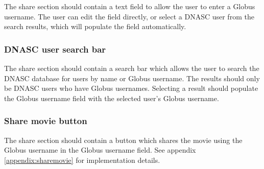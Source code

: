 The share section should contain a text field to allow the user to enter a Globus
username. The user can edit the field directly, or select a DNASC user from the search 
results, which will populate the field automatically.

\subsubsection{DNASC user search bar}

The share section should contain a search bar which allows the user to search the DNASC
database for users by name or Globus username. The results should only be DNASC users who 
have Globus usernames. Selecting a result should populate the Globus username field with 
the selected user's Globus username. 

\subsubsection{Share movie button}

The share section should contain a button which shares the movie using the Globus 
username in the Globus username field.
See appendix \ref{appendix:sharemovie} for implementation details.